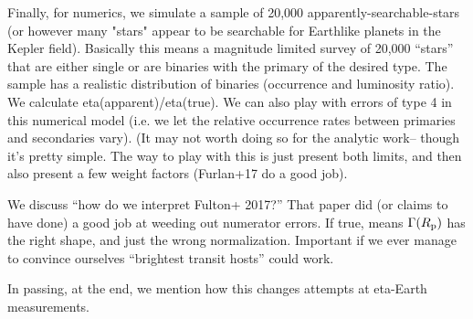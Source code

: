\documentclass{emulateapj}
\begin{document}
Finally, for numerics, we simulate a sample of 20,000 
apparently-searchable-stars (or however many "stars" appear to be searchable
for Earthlike planets in the Kepler field).  Basically this means a magnitude
limited survey of 20,000 ``stars'' that are either single or are binaries with
the primary of the desired type.  The sample has a realistic distribution of
binaries (occurrence and luminosity ratio).  We calculate 
eta(apparent)/eta(true).  We can also play with errors of type 4 in this
numerical model (i.e. we let the relative occurrence rates between primaries 
and secondaries vary).  (It may not worth doing so for the analytic 
work-- though it's pretty simple. The way to play with this is just present 
both limits, and then also present a few weight factors (Furlan+17 do a good 
job).


We discuss ``how do we interpret Fulton+ 2017?''
That paper did (or claims to have done) a good job at weeding out numerator
errors. If true, means $\Gamma(R_{\rm p})$ has the right shape, and just the 
wrong normalization. Important if we ever manage to convince ourselves 
``brightest transit hosts'' could work.

In passing, at the end, we mention how this changes attempts at eta-Earth 
measurements.
\end{document}
